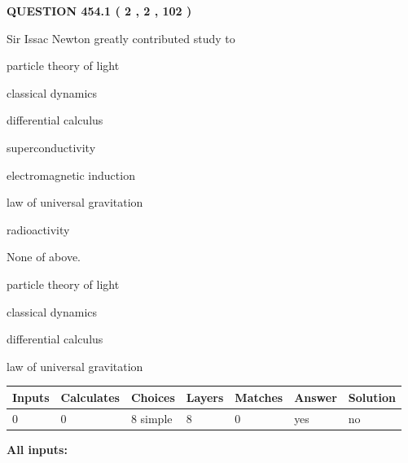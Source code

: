 \documentclass[12pt]{article}
\begin{document}
{\textbf{\Large{QUESTION
454.1 
 ( 2 , 2 , 102 )
}}}
  
  
Sir Issac Newton greatly contributed study to
 
 
particle theory of light
 
 
classical dynamics
 
 
differential calculus
 
 
superconductivity
 
 
electromagnetic induction
 
 
law of universal gravitation
 
 
radioactivity
 
 
 None of above.
 
 
\noindent{}
 
 
particle theory of light
 
 
classical dynamics
 
 
differential calculus
 
 
law of universal gravitation
 
 
\noindent{}
 
 
   
   
   
   
\noindent\begin{tabular}{|l|l|l|l|l|l|l|}
 \hline
Inputs & Calculates & Choices & Layers & Matches & Answer & Solution \\ \hline
 0  & 
 0  & 
 8
  simple  
  & 
 8  & 
 0  & 
  yes & 
  no 
  \\ \hline
 \end{tabular}
   
   
   
   
\noindent{}
   
   
   
   
\noindent\vspace{0.1in}\hspace{-0.08in} {\textbf{\Large{All inputs: }}}
   
\end{document}
